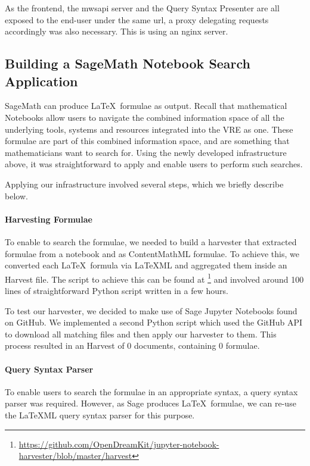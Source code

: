 As the frontend, the mwsapi server and the Query Syntax Presenter are all exposed to the end-user under the same url, a proxy delegating requests accordingly was also necessary. 
This is using an nginx server. 

\subsection{Building a SageMath Notebook Search Application}

SageMath can produce \LaTeX\ formulae as output. 
Recall that mathematical Notebooks allow users to navigate the combined information space of all the underlying tools, systems and resources integrated into the VRE as one. 
These formulae are part of this combined information space, and are something that mathematicians want to search for.
Using the newly developed infrastructure above, it was straightforward to apply \MWS and enable users to perform such searches. 

Applying our infrastructure involved several steps, which we briefly describe below.

\paragraph{Harvesting Formulae}
To enable \MWS to search the formulae, we needed to build a harvester that extracted formulae from a notebook and as ContentMathML formulae. 
To achieve this, we converted each \LaTeX\ formula via LaTeXML and aggregated them inside an \MWS Harvest file. 
The script to achieve this can be found at \footnote{\url{https://github.com/OpenDreamKit/jupyter-notebook-harvester/blob/master/harvest}} and involved around 100 lines of straightforward Python script written in a few hours. 

To test our harvester, we decided to make use of Sage Jupyter Notebooks found on GitHub. 
We implemented a second Python script which used the GitHub API to download all matching files and then apply our harvester to them. 
This process resulted in an \MWS Harvest of $0$ documents, containing $0$ formulae.

\paragraph{Query Syntax Parser}

To enable users to search the formulae in an appropriate syntax, a query syntax parser was required. 
However, as Sage produces \LaTeX\ formulae, we can re-use the {\LaTeX}ML query syntax parser for this purpose. 

